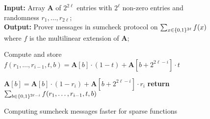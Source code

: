 \begin{figure}[t!]
	
	\begin{algorithm}[H]
		\caption{Computing sumcheck messages faster for sparse functions}\label{alg::sparse}
		\hspace*{\algorithmicindent} \textbf{Input:} Array \textbf{A} of $2^{2\ell}$ entries with  $2^\ell$ non-zero entries and randomness $r_1,\ldots,r_{2\ell}$;  \\
		\hspace*{\algorithmicindent} \textbf{Output:} Prover messages in sumcheck protocol on $\sum_{x\in\{0,1\}^{2\ell}}f(x)$ where $f$ is the multilinear extension of \textbf{A};  
		\begin{algorithmic}[1]
			
			 \label{alg::recuced_time}
			\State\label{alg::dynamic::compute} Compute and store $f(r_1,\ldots, r_{i-1}, t, b) = \textbf{A}[b]\cdot(1-t)+\textbf{A}[b+2^{2\ell-i}]\cdot t$
			\EndFor
			
			\State\label{alg::dynamic::update} $\textbf{A}[b]=\textbf{A}[b]\cdot(1-r_i)+\textbf{A}[b+2^{2\ell-i}]\cdot r_i$
			\EndFor
			\State\label{alg::dynamic::sum} \textbf{return} $\sum_{b\in\{0,1\}^{2\ell-i}}f(r_1,\ldots, r_{i-1}, t, b)$
			\EndFor
			
			\EndFor
			
		\end{algorithmic}
	\end{algorithm}

\end{figure}


					
